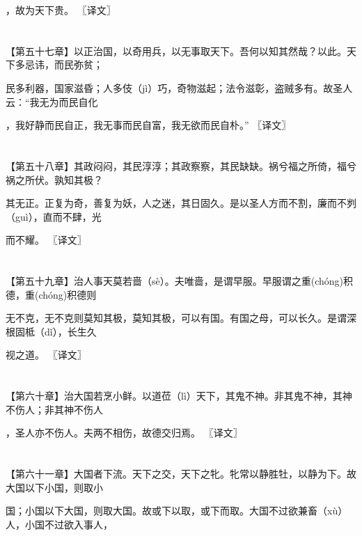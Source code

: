 \documentclass[a4paper,12pt,UTF8,twoside]{ctexbook}
\begin{document}
	，故为天下贵。 〖译文〗
	
	\chapter{}	
	
	【第五十七章】以正治国，以奇用兵，以无事取天下。吾何以知其然哉？以此。天下多忌讳，而民弥贫；
	
	民多利器，国家滋昏；人多伎（jì）巧，奇物滋起；法令滋彰，盗贼多有。故圣人云：“我无为而民自化
	
	，我好静而民自正，我无事而民自富，我无欲而民自朴。” 〖译文〗
	
	\chapter{}	
	
	【第五十八章】其政闷闷，其民淳淳；其政察察，其民缺缺。祸兮福之所倚，福兮祸之所伏。孰知其极？
	
	其无正。正复为奇，善复为妖，人之迷，其日固久。是以圣人方而不割，廉而不刿（guì），直而不肆，光
	
	而不耀。 〖译文〗
	
	\chapter{}	
	
	【第五十九章】治人事天莫若啬（sè）。夫唯啬，是谓早服。早服谓之重(chóng)积德，重(chóng)积德则
	
	无不克，无不克则莫知其极，莫知其极，可以有国。有国之母，可以长久。是谓深根固柢（dǐ），长生久
	
	视之道。 〖译文〗
	
	\chapter{}	
	
	【第六十章】治大国若烹小鲜。以道莅（lì）天下，其鬼不神。非其鬼不神，其神不伤人；非其神不伤人
	
	，圣人亦不伤人。夫两不相伤，故德交归焉。 〖译文〗
	
	\chapter{}	
	
	【第六十一章】大国者下流。天下之交，天下之牝。牝常以静胜牡，以静为下。故大国以下小国，则取小
	
	国；小国以下大国，则取大国。故或下以取，或下而取。大国不过欲兼畜（xù）人，小国不过欲入事人，
	
\end{document}
